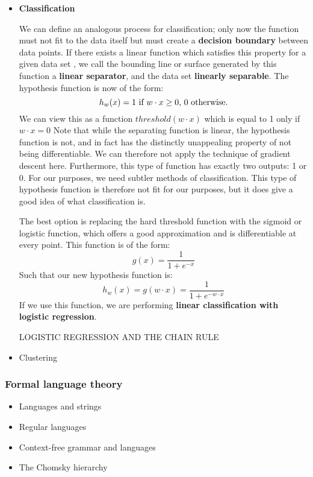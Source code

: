 \begin{itemize}
\item { 
    \textbf{Classification} 

    We can define an analogous process for classification; only now
    the function must not fit to the data itself but must create a
    \textbf{decision boundary} between data points. If there exists a
    linear function which satisfies this property for a given data set
    , we call the bounding line or surface generated by this function a
    \textbf{linear separator}, and the data set \textbf{linearly
      separable}. The hypothesis function is now of the form:
    \begin{equation}
      h_w(x) = 1$ if $ w \cdot x \geq 0$, $0$ otherwise.$
    \end{equation}
    We can view this as a function $threshold(w \cdot x)$ which is
    equal to 1 only if $w \cdot x = 0$ Note that while the separating
    function is linear, the hypothesis function is not, and in fact has
    the distinctly unappealing property of not being differentiable. We
    can therefore not apply the technique of gradient descent
    here. Furthermore, this type of function has exactly two outputs: 1 or
    0. For our purposes, we need subtler methods of classification.  This
    type of hypothesis function is therefore not fit for our purposes, but
    it does give a good idea of what classification is.

    The best option is replacing the hard threshold function with the
    sigmoid or logistic function, which offers a good approximation and is
    differentiable at every point. This function is of the form:
    \begin{equation}
      g(x) = \frac{1}{1 + e^{-x}}
    \end{equation}
    Such that our new hypothesis function is:
    \begin{equation}
      h_w(x) = g(w \cdot x) = \frac{1}{1 + e^{- w \cdot x}}
    \end{equation}
    If we use this function, we are performing \textbf{linear
      classification with logistic regression}.

    LOGISTIC REGRESSION AND THE CHAIN RULE
  }

  \item Clustering
\end{itemize}


\subsubsection{Formal language theory}
\label{sec:formalgrammars}
\begin{itemize}
  \item Languages and strings
  \item Regular languages
  \item Context-free grammar and languages
  \item The Chomsky hierarchy
\end{itemize}


